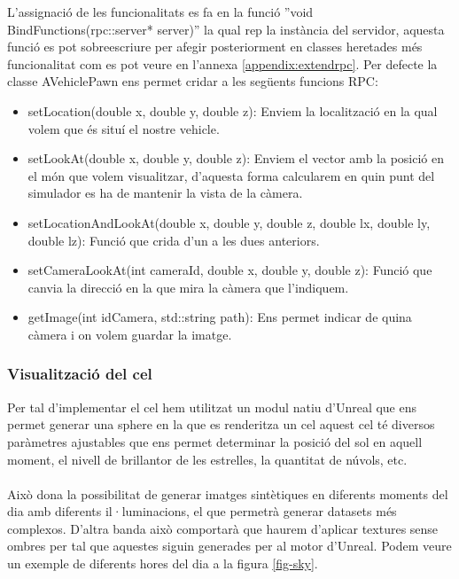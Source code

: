 \documentclass[10pt,a4paper,twocolumn,twoside]{article}
\begin{document}
L'assignació de les funcionalitats es fa en la funció ''void BindFunctions(rpc::server* server)'' la qual rep la instància del servidor, aquesta funció es pot sobreescriure per afegir posteriorment en classes heretades més funcionalitat com es pot veure en l'annexa \ref{appendix:extendrpc}. Per defecte la classe AVehiclePawn ens permet cridar a les següents funcions RPC:

\begin{itemize}
\item setLocation(double x, double y, double z): Enviem la localització en la qual volem que és situí el nostre vehicle.

\item setLookAt(double x, double y, double z): Enviem el vector amb la posició en el món que volem visualitzar, d'aquesta forma calcularem en quin punt del simulador es ha de mantenir la vista de la càmera.

\item setLocationAndLookAt(double x, double y, double z, double lx, double ly, double lz): Funció que crida d'un a les dues anteriors.

\item setCameraLookAt(int cameraId, double x, double y, double z): Funció que canvia la direcció en la que mira la càmera que l'indiquem.

\item getImage(int idCamera, std::string path): Ens permet indicar de quina càmera i on volem guardar la imatge.
\end{itemize}

\subsubsection{Visualització del cel}
Per tal d'implementar el cel hem utilitzat un modul natiu d'Unreal que ens permet generar una sphere en la que es renderitza un cel aquest cel té diversos paràmetres ajustables que ens permet determinar la posició del sol en aquell moment, el nivell de brillantor de les estrelles, la quantitat de núvols, etc. 
\\\\
Això dona la possibilitat de generar imatges sintètiques en diferents moments del dia amb diferents il·luminacions, el que permetrà generar datasets més complexos. D'altra banda això comportarà que haurem d'aplicar textures sense ombres per tal que aquestes siguin generades per al motor d'Unreal. Podem veure un exemple de diferents hores del dia a la figura \ref{fig-sky}.
\end{document}
